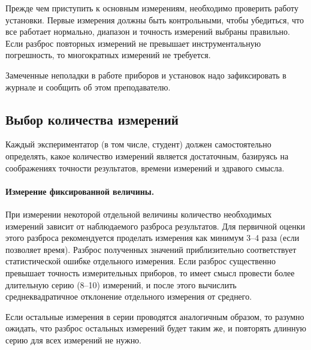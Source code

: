 Прежде чем приступить к основным измерениям, необходимо проверить
работу установки. Первые измерения должны быть контрольными, чтобы
убедиться, что все работает нормально, диапазон и точность измерений
выбраны правильно. Если разброс повторных измерений не превышает
инструментальную погрешность, то многократных измерений не требуется.

Замеченные неполадки в работе приборов и установок надо зафиксировать в журнале
и сообщить об этом преподавателю.

\subsection{Выбор количества измерений}

Каждый экспериментатор
(в том числе, студент) должен самостоятельно определять, какое количество
измерений является достаточным, базируясь на соображениях точности результатов,
времени измерений и здравого смысла.


\paragraph{Измерение фиксированной величины.}
При измерении некоторой отдельной величины количество необходимых измерений
зависит от наблюдаемого разброса результатов. Для первичной оценки этого разброса
рекомендуется проделать измерения как минимум 3--4 раза (если позволяет время).
Разброс полученных значений приблизительно соответствует
статистической ошибке отдельного измерения. Если разброс существенно превышает
точность измерительных приборов, то имеет смысл провести более длительную серию (8--10) измерений, и после этого вычислить среднеквадратичное отклонение отдельного измерения от среднего.

Если остальные измерения в серии проводятся аналогичным образом,
то разумно ожидать, что разброс остальных измерений будет таким же,
и повторять длинную серию  для всех измерений не нужно.

